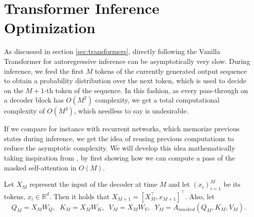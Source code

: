 \section{Transformer Inference Optimization}
\label{sec:appendix}

As discussed in section \ref{sec:transformers}, directly following the Vanilla Transformer for autoregressive inference can be asymptotically very slow. During inference, we feed the first $M$ tokens of the currently generated output sequence to obtain a probability distribution over the next token, which is used to decide on the $M+1$-th token of the sequence. In this fashion, as every pass-through on a decoder block has $O(M^2)$ complexity, we get a total computational complexity of $O(M^3)$, which needless to say is undesirable.

If we compare for instance with recurrent networks, which memorize previous states during inference, we get the idea of reusing previous computations to reduce the asymptotic complexity. We will develop this idea mathematically taking inspiration from \cite{leimao2023optiminference}, by first showing how we can compute a pass of the masked self-attention in $O(M)$. 

Let $X_M$ represent the input of the decoder at time $M$ and let $(x_i)_{i=1}^M$ be its tokens, $x_i \in \mathbb{R}^d$. Then it holds that $X_{M+1} = [X_M^\top, x_{M+1}]^\top$. Also, let 
\begin{equation}
    Q_M = X_M W_Q, \;\; K_M = X_M W_K, \;\; V_M = X_M W_V,\;\; Y_M = A_{masked}(Q_M, K_M, V_M).
\end{equation}

